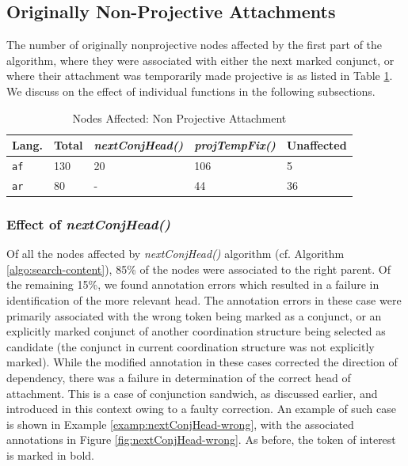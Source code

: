 \subsection{Originally Non-Projective Attachments}

The number of originally nonprojective nodes affected by the first part of the algorithm, where they were associated with either the next marked conjunct, or where their attachment was temporarily made projective is as listed in Table \ref{tab:affectedNodes1}. We discuss on the effect of individual functions in the following subsections.

\begin{table}[H]
\centering
    \begin{tabular}{|l|l|l|l|l|}
        \hline
        \textbf{Lang.} & \textbf{Total} & \textit{nextConjHead()} & \textit{projTempFix()} & Unaffected\\
        \hline
        \texttt{af} & 130 & 20 & 106 & 5\\
        \texttt{ar} & 80 & - & 44 & 36\\
        \hline
    \end{tabular}
    \caption{Nodes Affected: Non Projective Attachment}
    \label{tab:affectedNodes1}
\end{table}

\subsubsection{Effect of \textit{nextConjHead()}}

Of all the nodes affected by \textit{nextConjHead()} algorithm (cf. Algorithm \ref{algo:search-content}), 85\% of the nodes were associated to the right parent. Of the remaining 15\%, we found annotation errors which resulted in a failure in identification of the more relevant head. The annotation errors in these case were primarily associated with the wrong token being marked as a conjunct, or an explicitly marked conjunct of another coordination structure being selected as candidate (the conjunct in current coordination structure was not explicitly marked). While the modified annotation in these cases corrected the direction of dependency, there was a failure in determination of the correct head of attachment. This is a case of conjunction sandwich, as discussed earlier, and introduced in this context owing to a faulty correction. An example of such case is shown in Example \ref{examp:nextConjHead-wrong}, with the associated annotations in Figure \ref{fig:nextConjHead-wrong}. As before, the token of interest is marked in bold.

